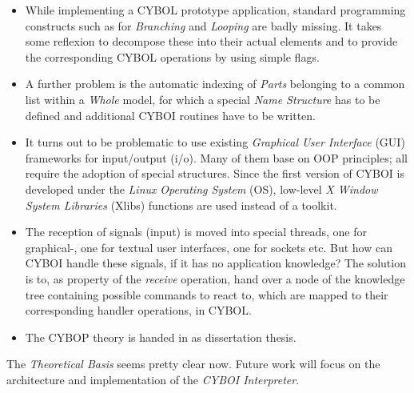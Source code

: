 \begin{itemize}
        UNIX and TCP/IP sockets.
    \item[2005] While implementing a CYBOL prototype application, standard
        programming constructs such as for \emph{Branching} and \emph{Looping}
        are badly missing. It takes some reflexion to decompose these into
        their actual elements and to provide the corresponding CYBOL operations
        by using simple flags.
    \item[2005] A further problem is the automatic indexing of \emph{Parts}
        belonging to a common list within a \emph{Whole} model, for which a
        special \emph{Name Structure} has to be defined and additional CYBOI
        routines have to be written.
    \item[2005] It turns out to be problematic to use existing
        \emph{Graphical User Interface} (GUI) frameworks for input/output
        (i/o). Many of them base on OOP principles; all require the adoption of
        special structures. Since the first version of CYBOI is developed under
        the \emph{Linux} \emph{Operating System} (OS), low-level
        \emph{X Window System Libraries} (Xlibs) functions are used instead of
        a toolkit.
    \item[2005] The reception of signals (input) is moved into special threads,
        one for graphical-, one for textual user interfaces, one for sockets
        etc. But how can CYBOI handle these signals, if it has no application
        knowledge? The solution is to, as property of the \emph{receive}
        operation, hand over a node of the knowledge tree containing possible
        commands to react to, which are mapped to their corresponding handler
        operations, in CYBOL.
    \item[2005] The CYBOP theory is handed in as dissertation thesis.
\end{itemize}

The \emph{Theoretical Basis} seems pretty clear now. Future work will focus
on the architecture and implementation of the \emph{CYBOI Interpreter}.

